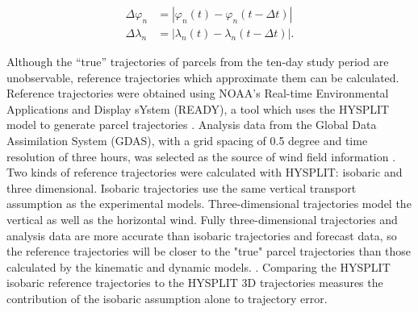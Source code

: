\begin{align}
    \Delta \varphi_n &= | \varphi_n (t) - \varphi_n (t - \Delta t) | \\
    \Delta \lambda_n &= |\lambda_n (t) - \lambda_n (t - \Delta t)|.
\end{align}

Although the ``true'' trajectories of parcels from the ten-day study period are unobservable, reference trajectories which approximate them can be calculated.
Reference trajectories were obtained using NOAA's Real-time Environmental Applications and Display sYstem (READY), a tool which uses the HYSPLIT model to generate parcel trajectories \cite{rolph_real-time_2017}.
Analysis data from the Global Data Assimilation System (GDAS), with a grid spacing of 0.5 degree and time resolution of three hours, was selected as the source of wind field information \cite{noaa_global_2004}.
Two kinds of reference trajectories were calculated with HYSPLIT: isobaric and three dimensional.
Isobaric trajectories use the same vertical transport assumption as the experimental models. 
Three-dimensional trajectories model the vertical as well as the horizontal wind.
Fully three-dimensional trajectories and analysis data are more accurate than isobaric trajectories and forecast data, 
so the reference trajectories will be closer to the "true" parcel trajectories than those calculated by the kinematic and dynamic models.  \cite{stohl_computation_1998}.
Comparing the HYSPLIT isobaric reference trajectories to the HYSPLIT 3D trajectories measures the contribution of the isobaric assumption alone to trajectory error.



  
